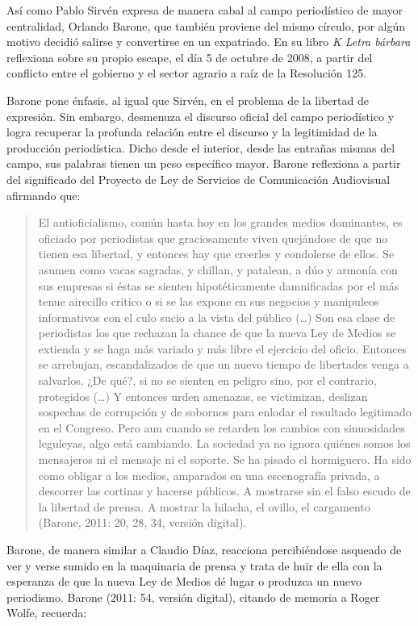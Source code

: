 {Así como Pablo Sirvén expresa de manera cabal al campo periodístico de mayor centralidad, Orlando Barone, que también proviene del mismo círculo, por algún motivo decidió salirse y convertirse en un expatriado. En su libro \emph{K Letra bárbara} reflexiona sobre su propio escape, el día 5 de octubre de 2008, a partir del conflicto entre el gobierno y el sector agrario a raíz de la Resolución 125.

Barone pone énfasis, al igual que Sirvén, en el problema de la libertad de expresión. Sin embargo, desmenuza el discurso oficial del campo periodístico y logra recuperar la profunda relación entre el discurso y la legitimidad de la producción periodística. Dicho desde el interior, desde las entrañas mismas del campo, sus palabras tienen un peso específico mayor. Barone reflexiona a partir del significado del Proyecto de Ley de Servicios de Comunicación Audiovisual afirmando que:

\begin{quote}
El antioficialismo, común hasta hoy en los grandes medios dominantes, es oficiado por periodistas que graciosamente viven quejándose de que no tienen esa libertad, y entonces hay que creerles y condolerse de ellos. Se asumen como vacas sagradas, y chillan, y patalean, a dúo y armonía con sus empresas si éstas se sienten hipotéticamente damnificadas por el más tenue airecillo crítico o si se las expone en sus negocios y manipuleos informativos con el culo sucio a la vista del público (\ldots) Son esa clase de periodistas los que rechazan la chance de que la nueva Ley de Medios se extienda y se haga más variado y más libre el ejercicio del oficio. Entonces se arrebujan, escandalizados de que un nuevo tiempo de libertades venga a salvarlos. ¿De qué?, si no se sienten en peligro sino, por el contrario, protegidos (\ldots) Y entonces urden amenazas, se victimizan, deslizan sospechas de corrupción y de sobornos para enlodar el resultado legitimado en el Congreso. Pero aun cuando se retarden los cambios con sinuosidades leguleyas, algo está cambiando. La sociedad ya no ignora quiénes somos los mensajeros ni el mensaje ni el soporte. Se ha pisado el hormiguero. Ha sido como obligar a los medios, amparados en una escenografía privada, a descorrer las cortinas y hacerse públicos. A mostrarse sin el falso escudo de la libertad de prensa. A mostrar la hilacha, el ovillo, el cargamento (Barone, 2011: 20, 28, 34, versión digital).
\end{quote}

Barone, de manera similar a Claudio Díaz, reacciona percibiéndose asqueado de ver y verse sumido en la maquinaria de prensa y trata de huir de ella con la esperanza de que la nueva Ley de Medios dé lugar o produzca un nuevo periodismo. Barone (2011: 54, versión digital), citando de memoria a Roger Wolfe, recuerda:

}
